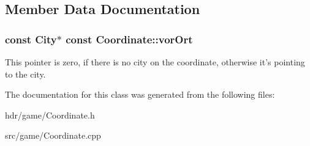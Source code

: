 \subsection{Member Data Documentation}
\subsubsection[{vor\-Ort}]{\setlength{\rightskip}{0pt plus 5cm}const {\bf City}$\ast$ const Coordinate\-::vor\-Ort}\label{class_coordinate_aa8e26100ecf4f1c45555a7cb14f6364e}
This pointer is zero, if there is no city on the coordinate, otherwise it's pointing to the city. 

The documentation for this class was generated from the following files\-:\begin{DoxyCompactItemize}
\item 
hdr/game/Coordinate.\-h\item 
src/game/Coordinate.\-cpp\end{DoxyCompactItemize}
